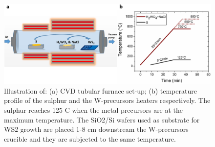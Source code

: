 \documentclass[12pt]{article}
\begin{document}



\begin{figure}[h]
\begin{center}
\includegraphics[scale=0.3]{PaperSIFurnace.png}
\caption{Illustration of: (a) CVD tubular furnace set-up; (b) temperature profile of the sulphur and the W-precursors heaters respectively. The sulphur reaches 125 {\degree}C when the metal precursors are at the maximum temperature. The SiO2/Si wafers used as substrate for WS2 growth are placed 1-8 cm downstream the W-precursors crucible and they are subjected to the same temperature.}
\label{fig:PaperSIFurnace}
\end{center}
\end{figure}
\end{document}
